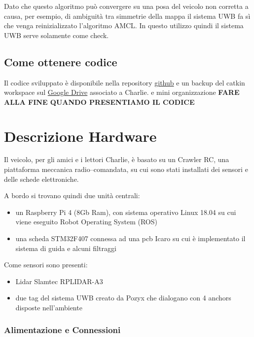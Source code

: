 Dato che questo algoritmo pu\`o convergere su una posa del veicolo non corretta a causa, per esempio, di ambiguit\`a  tra simmetrie della mappa 
il sistema UWB fa s\`i che venga reinizializzato l'algoritmo AMCL. 
In questo utilizzo quindi il sistema UWB serve solamente come check.

\subsection*{Come ottenere codice}
Il codice sviluppato \`e disponibile nella repository \href{https://github.com/ABiondi12/project_sgn}{github} e un backup del catkin workspace sul 
\href{https://drive.google.com/drive/folders/1rXppVs0qSfeEKQumRFrPhkpiYDCvTXOL?usp=sharing}{Google Drive} associato a Charlie. 
e mini organizzazione \textbf{FARE ALLA FINE QUANDO PRESENTIAMO IL CODICE}


\newpage
\section{Descrizione Hardware}

Il veicolo, per gli amici e i lettori Charlie, è basato su un Crawler RC, una piattaforma meccanica radio--comandata,  su cui sono stati installati dei sensori e delle schede elettroniche. 

A bordo si trovano quindi due unità centrali:
\begin{itemize}
	\item un Raspberry Pi 4 (8Gb Ram), con sistema operativo Linux 18.04 su cui viene eseguito Robot Operating System (ROS)
	\item una scheda STM32F407 connessa ad una pcb Icaro su cui è implementato il sistema di guida e alcuni filtraggi
\end{itemize}

Come sensori sono presenti:
\begin{itemize}
	\item Lidar Slamtec RPLIDAR-A3
	
	\item due tag del sistema UWB creato da Pozyx che dialogano con 4 anchors disposte nell'ambiente
\end{itemize}

\subsubsection*{Alimentazione e Connessioni}

